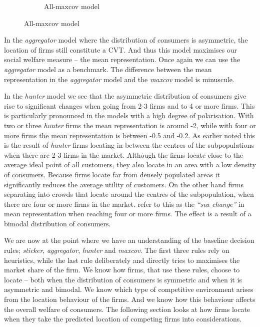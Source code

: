 \documentclass[preprint, 12pt]{elsarticle}
\begin{document}
\begin{figure}[ht!]
\begin{subfigure}[t]{0.315\textwidth}
		\caption{All-maxcov model}
		\label{fig:representation_maxcov}
	\end{subfigure}
	
	\label{fig:asymetric_representation}
\end{figure}

In the \emph{aggregator} model where the distribution of consumers is asymmetric, the location of firms still constitute a CVT. And thus this model maximises our social welfare measure -- the mean representation. Once again we can use the \emph{aggregator} model as a benchmark. The difference between the mean representation in the \emph{aggregator} model and the \emph{maxcov} model is minuscule.

In the \emph{hunter} model we see that the asymmetric distribution of consumers give rise to significant changes when going from 2-3 firms and to 4 or more firms. This is particularly pronounced in the models with a high degree of polarisation. With two or three \emph{hunter} firms the mean representation is around -2, while with four or more firms the mean representation is between -0.5 and -0.2. As earlier noted this is the result of \emph{hunter} firms locating in between the centres of the subpopulations when there are 2-3 firms in the market. Although the firms locate close to the average ideal point of all customers, they also locate in an area with a low density of consumers. Because firms locate far from densely populated areas it significantly reduces the average utility of customers. On the other hand firms separating into crowds that locate around the centres of the subpopulation, when there are four or more firms in the market. \citet[chapter~5, p.~102]{Laver_Sergenti_2011} refer to this as the \emph{``sea change''} in mean representation when reaching four or more firms. The effect is a result of a bimodal distribution of consumers.

We are now at the point where we have an understanding of the baseline decision rules; \emph{sticker}, \emph{aggregator}, \emph{hunter} and \emph{maxcov}. The first three rules rely on heuristics, while the last rule deliberately and directly tries to maximises the market share of the firm. We know how firms, that use these rules, choose to locate -- both when the distribution of consumers is symmetric and when it is asymmetric and bimodal. We know which type of competitive environment arises from the location behaviour of the firms. And we know how this behaviour affects the overall welfare of consumers. The following section looks at how firms locate when they take the predicted location of competing firms into considerations.
\end{document}
